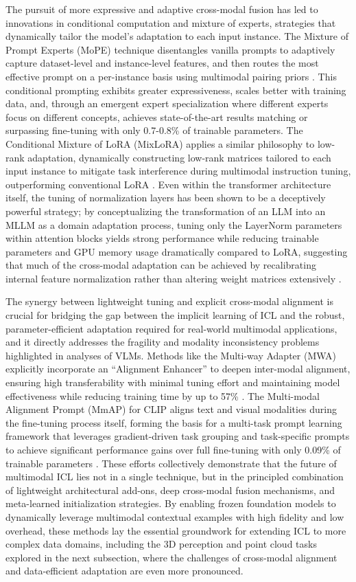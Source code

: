 \documentclass[11pt]{article}
\begin{document}
The pursuit of more expressive and adaptive cross-modal fusion has led to innovations in conditional computation and mixture of experts, strategies that dynamically tailor the model's adaptation to each input instance. The Mixture of Prompt Experts (MoPE) technique disentangles vanilla prompts to adaptively capture dataset-level and instance-level features, and then routes the most effective prompt on a per-instance basis using multimodal pairing priors \cite{ref251}. This conditional prompting exhibits greater expressiveness, scales better with training data, and, through an emergent expert specialization where different experts focus on different concepts, achieves state-of-the-art results matching or surpassing fine-tuning with only 0.7-0.8\% of trainable parameters. The Conditional Mixture of LoRA (MixLoRA) applies a similar philosophy to low-rank adaptation, dynamically constructing low-rank matrices tailored to each input instance to mitigate task interference during multimodal instruction tuning, outperforming conventional LoRA \cite{ref195}. Even within the transformer architecture itself, the tuning of normalization layers has been shown to be a deceptively powerful strategy; by conceptualizing the transformation of an LLM into an MLLM as a domain adaptation process, tuning only the LayerNorm parameters within attention blocks yields strong performance while reducing trainable parameters and GPU memory usage dramatically compared to LoRA, suggesting that much of the cross-modal adaptation can be achieved by recalibrating internal feature normalization rather than altering weight matrices extensively \cite{ref252}.

The synergy between lightweight tuning and explicit cross-modal alignment is crucial for bridging the gap between the implicit learning of ICL and the robust, parameter-efficient adaptation required for real-world multimodal applications, and it directly addresses the fragility and modality inconsistency problems highlighted in analyses of VLMs. Methods like the Multi-way Adapter (MWA) explicitly incorporate an ``Alignment Enhancer'' to deepen inter-modal alignment, ensuring high transferability with minimal tuning effort and maintaining model effectiveness while reducing training time by up to 57\% \cite{ref253}. The Multi-modal Alignment Prompt (MmAP) for CLIP aligns text and visual modalities during the fine-tuning process itself, forming the basis for a multi-task prompt learning framework that leverages gradient-driven task grouping and task-specific prompts to achieve significant performance gains over full fine-tuning with only 0.09\% of trainable parameters \cite{ref254}. These efforts collectively demonstrate that the future of multimodal ICL lies not in a single technique, but in the principled combination of lightweight architectural add-ons, deep cross-modal fusion mechanisms, and meta-learned initialization strategies. By enabling frozen foundation models to dynamically leverage multimodal contextual examples with high fidelity and low overhead, these methods lay the essential groundwork for extending ICL to more complex data domains, including the 3D perception and point cloud tasks explored in the next subsection, where the challenges of cross-modal alignment and data-efficient adaptation are even more pronounced.
\end{document}

